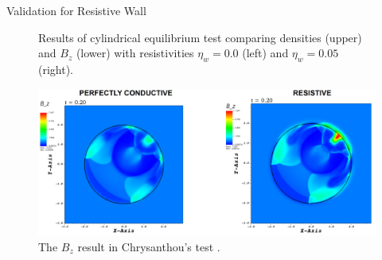 \documentclass[final]{beamer}
\begin{document}
\begin{frame}{}
\begin{textblock}{19.0}
\begin{block}{Validation for Resistive Wall}
\begin{minipage}{0.93\linewidth}
\begin{figure}
			\begin{minipage}{1.0\linewidth}
				\caption{Results of cylindrical equilibrium test comparing densities (upper) and $B_z$ (lower) with resistivities $\eta_{w}=0.0$ (left) and $\eta_{w}=0.05$ (right).}
				\label{fig:cy_mine}
			\end{minipage}
		\end{figure}
		\vspace{0.2cm}
		
		\begin{figure}
			\begin{minipage}{0.90\linewidth}
				\includegraphics[width=\textwidth]{MariaResult2.png}
			\end{minipage}
			
			\begin{minipage}{1.0\linewidth}
				\caption{The $B_z$ result in Chrysanthou's test \cite{chrysanthou2020}.}
				\label{fig:cyBz_Maria}
			\end{minipage}
		\end{figure}
	\end{minipage}
\end{block}
\vspace{-0.5cm}	
	

\end{textblock}
\end{frame}
\end{document}
